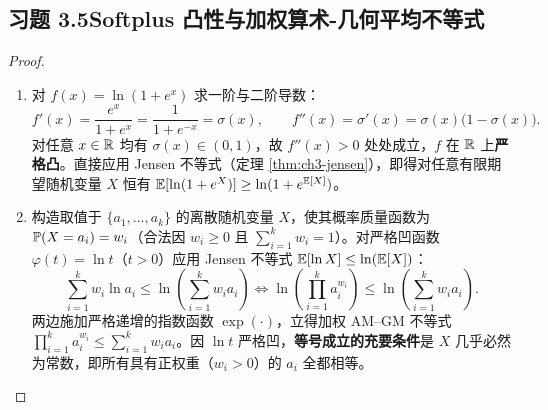 \subsection*{习题 3.5\quad Softplus 凸性与加权算术-几何平均不等式}
\begin{proof}
\begin{enumerate}[label=(\arabic*), leftmargin=1.8em]
  \item 对 $f(x) = \ln(1 + e^x)$ 求一阶与二阶导数：
  \[
    f'(x) = \frac{e^x}{1 + e^x} = \frac{1}{1 + e^{-x}} = \sigma(x), \qquad
    f''(x) = \sigma'(x) = \sigma(x)\bigl(1 - \sigma(x)\bigr).
  \]
  对任意 $x \in \mathbb{R}$ 均有 $\sigma(x) \in (0, 1)$，故 $f''(x) > 0$ 处处成立，$f$ 在 $\mathbb{R}$ 上\textbf{严格凸}。直接应用 Jensen 不等式（定理 \ref{thm:ch3-jensen}），即得对任意有限期望随机变量 $X$ 恒有 $\mathbb{E}[\ln(1 + e^X)] \ge \ln(1 + e^{\mathbb{E}[X]})$。
  \item 构造取值于 $\{a_1, \dots, a_k\}$ 的离散随机变量 $X$，使其概率质量函数为 $\mathbb{P}(X = a_i) = w_i$（合法因 $w_i \ge 0$ 且 $\sum_{i=1}^k w_i = 1$）。对严格凹函数 $\varphi(t) = \ln t$（$t > 0$）应用 Jensen 不等式 $\mathbb{E}[\ln X] \le \ln(\mathbb{E}[X])$：
  \[
    \sum_{i=1}^k w_i \ln a_i \le \ln\!\left(\sum_{i=1}^k w_i a_i\right)
    \iff \ln\!\left(\prod_{i=1}^k a_i^{w_i}\right) \le \ln\!\left(\sum_{i=1}^k w_i a_i\right).
  \]
  两边施加严格递增的指数函数 $\exp(\cdot)$，立得加权 AM--GM 不等式 $\prod_{i=1}^k a_i^{w_i} \le \sum_{i=1}^k w_i a_i$。因 $\ln t$ 严格凹，\textbf{等号成立的充要条件}是 $X$ 几乎必然为常数，即所有具有正权重（$w_i > 0$）的 $a_i$ 全都相等。
\end{enumerate}
\end{proof}

